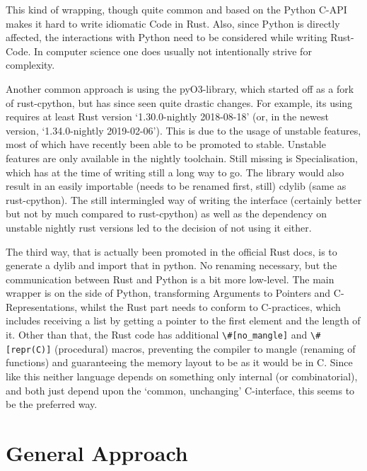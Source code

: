 This kind of wrapping, though quite common and based on the Python C-API makes
it hard to write idiomatic Code in Rust. Also, since Python is directly
affected, the interactions with Python need to be considered while writing
Rust-Code. In computer science one does usually not intentionally strive for
complexity.

Another common approach is using the pyO3-library, which started off as a fork
of rust-cpython, but has since seen quite drastic changes. For example, its
using requires at least Rust version ‘1.30.0-nightly 2018-08-18’ (or, in the
newest version, ‘1.34.0-nightly 2019-02-06’). This is due to the usage of
unstable features, most of which have recently been able to be promoted to
stable. Unstable features are only available in the nightly toolchain.  Still
missing is Specialisation, which has at the time of writing still a long way to
go.  The library would also result in an easily importable (needs to be renamed
first, still) cdylib (same as rust-cpython). The still intermingled way of
writing the interface (certainly better but not by much compared to
rust-cpython) as well as the dependency on unstable nightly rust versions led
to the decision of not using it either.

The third way, that is actually been promoted in the official Rust docs, is to
generate a dylib and import that in python. No renaming necessary, but the
communication between Rust and Python is a bit more low-level. The main wrapper
is on the side of Python, transforming Arguments to Pointers and
C-Representations, whilst the Rust part needs to conform to C-practices, which
includes receiving a list by getting a pointer to the first element and the
length of it. Other than that, the Rust code has additional
\verb!\#[no_mangle]! and \verb!\#[repr(C)]!  (procedural) macros, preventing
the compiler to mangle (renaming of functions) and guaranteeing the memory
layout to be as it would be in C. Since like this neither language depends on
something only internal (or combinatorial), and both just depend upon the
‘common, unchanging’ C-interface, this seems to be the preferred way.



\newpage
\section{General Approach}\label{sec:approach}




